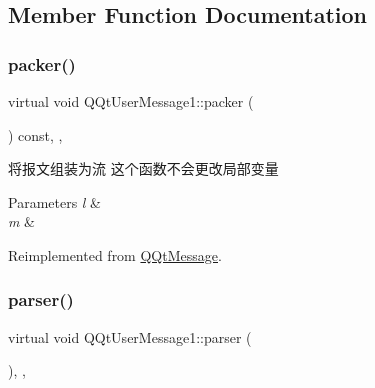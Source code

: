 \subsection{Member Function Documentation}
\mbox{\label{class_q_qt_user_message1_a10565bf777393d39e5fd2de9cf356344}} 
\subsubsection{\texorpdfstring{packer()}{packer()}}
{\footnotesize\ttfamily virtual void Q\+Qt\+User\+Message1\+::packer (\begin{DoxyParamCaption}\item[{Q\+Byte\+Array \&}]{ }\end{DoxyParamCaption}) const\hspace{0.3cm}{\ttfamily [inline]}, {\ttfamily [override]}, {\ttfamily [virtual]}}



将报文组装为流 这个函数不会更改局部变量 


\begin{DoxyParams}{Parameters}
{\em l} & \\
\hline
{\em m} & \\
\hline
\end{DoxyParams}


Reimplemented from \mbox{\hyperlink{class_q_qt_message_af1885c2c3628495808dca66ee8d72e14}{Q\+Qt\+Message}}.

\mbox{\label{class_q_qt_user_message1_a166f18692d123ac51dbf314717d41a5b}} 
\subsubsection{\texorpdfstring{parser()}{parser()}}
{\footnotesize\ttfamily virtual void Q\+Qt\+User\+Message1\+::parser (\begin{DoxyParamCaption}\item[{const Q\+Byte\+Array \&}]{ }\end{DoxyParamCaption})\hspace{0.3cm}{\ttfamily [inline]}, {\ttfamily [override]}, {\ttfamily [virtual]}}




